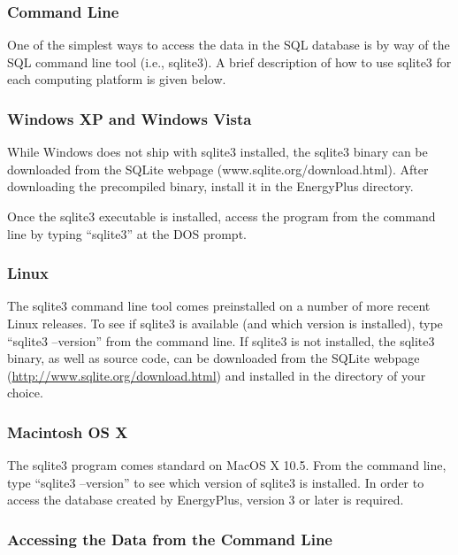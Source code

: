 \subsubsection{Command Line}\label{command-line}

One of the simplest ways to access the data in the SQL database is by way of the SQL command line tool (i.e., sqlite3). A brief description of how to use sqlite3 for each computing platform is given below.

\subsubsection{Windows XP and Windows Vista}\label{windows-xp-and-windows-vista}

While Windows does not ship with sqlite3 installed, the sqlite3 binary can be downloaded from the SQLite webpage (www.sqlite.org/download.html). After downloading the precompiled binary, install it in the EnergyPlus directory.

Once the sqlite3 executable is installed, access the program from the command line by typing ``sqlite3'' at the DOS prompt.

\subsubsection{Linux}\label{linux}

The sqlite3 command line tool comes preinstalled on a number of more recent Linux releases. To see if sqlite3 is available (and which version is installed), type ``sqlite3 --version'' from the command line. If sqlite3 is not installed, the sqlite3 binary, as well as source code, can be downloaded from the SQLite webpage (\url{http://www.sqlite.org/download.html}) and installed in the directory of your choice.

\subsubsection{Macintosh OS X}\label{macintosh-os-x}

The sqlite3 program comes standard on MacOS X 10.5. From the command line, type ``sqlite3 --version'' to see which version of sqlite3 is installed. In order to access the database created by EnergyPlus, version 3 or later is required.

\subsubsection{Accessing the Data from the Command Line}\label{accessing-the-data-from-the-command-line}

